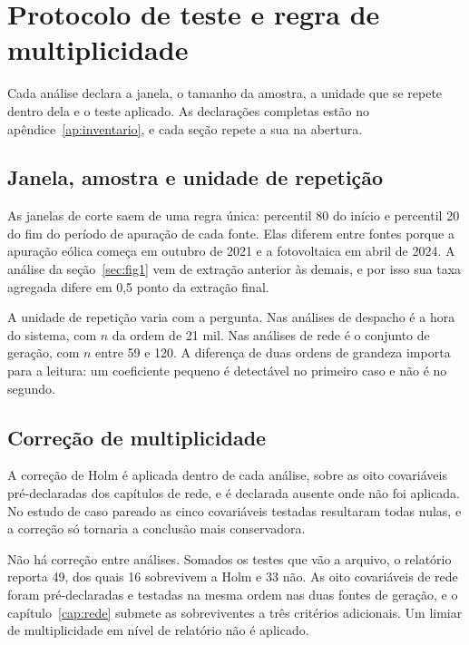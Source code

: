 \chapter{Protocolo de teste e regra de multiplicidade}
\label{cap:regra}

Cada análise declara a janela, o tamanho da amostra, a unidade que se repete
dentro dela e o teste aplicado. As declarações completas estão no
apêndice~\ref{ap:inventario}, e cada seção repete a sua na abertura.

\section{Janela, amostra e unidade de repetição}

As janelas de corte saem de uma regra única: percentil 80 do início e percentil
20 do fim do período de apuração de cada fonte. Elas diferem entre fontes porque
a apuração eólica começa em outubro de 2021 e a fotovoltaica em abril de 2024. A
análise da seção~\ref{sec:fig1} vem de extração anterior às demais, e por isso
sua taxa agregada difere em 0,5 ponto da extração final.

A unidade de repetição varia com a pergunta. Nas análises de despacho é a hora
do sistema, com $n$ da ordem de 21 mil. Nas análises de rede é o conjunto de
geração, com $n$ entre 59 e 120. A diferença de duas ordens de grandeza importa
para a leitura: um coeficiente pequeno é detectável no primeiro caso e não é no
segundo.

\section{Correção de multiplicidade}

A correção de Holm é aplicada dentro de cada análise, sobre as oito covariáveis
pré-declaradas dos capítulos de rede, e é declarada ausente onde não foi
aplicada. No estudo de caso pareado as cinco covariáveis testadas resultaram
todas nulas, e a correção só tornaria a conclusão mais conservadora.

Não há correção entre análises. Somados os testes que vão a arquivo, o relatório
reporta 49, dos quais 16 sobrevivem a Holm e 33 não. As oito covariáveis de rede
foram pré-declaradas e testadas na mesma ordem nas duas fontes de geração, e o
capítulo~\ref{cap:rede} submete as sobreviventes a três critérios adicionais. Um
limiar de multiplicidade em nível de relatório não é aplicado.

